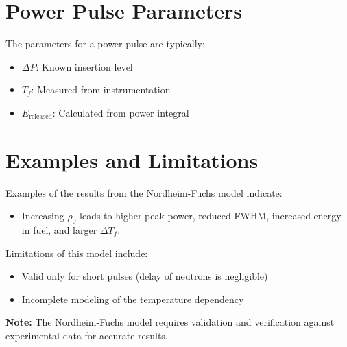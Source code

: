 \section{Power Pulse Parameters}

The parameters for a power pulse are typically:
\begin{itemize}
    \item $\Delta P$: Known insertion level
    \item $T_f$: Measured from instrumentation
    \item $E_{\text{released}}$: Calculated from power integral
\end{itemize}

\section{Examples and Limitations}

Examples of the results from the Nordheim-Fuchs model indicate:
\begin{itemize}
    \item Increasing $\rho_0$ leads to higher peak power, reduced FWHM, increased energy in fuel, and larger $\Delta T_f$.
\end{itemize}

Limitations of this model include:
\begin{itemize}
    \item Valid only for short pulses (delay of neutrons is negligible)
    \item Incomplete modeling of the temperature dependency
\end{itemize}

\begin{tcolorbox}[colback=white, colframe=cherenkovblue, boxrule=0.5mm, sharp corners]
\textbf{Note:} The Nordheim-Fuchs model requires validation and verification against experimental data for accurate results.
\end{tcolorbox}
